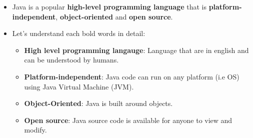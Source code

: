 
\begin{flushleft}

	\begin{itemize}
		\item Java is a popular \textbf{high-level programming language} that is \textbf{platform-independent}, \textbf{object-oriented} and \textbf{open source}.
		\item Let’s understand each bold words in detail:
		\begin{itemize}
			\item \textbf{High level programming langauge}: Language that are in english and can be understood by humans.
			
			
			\newpage
			
			\item \textbf{Platform-independent}: Java code can run on any platform (i.e OS) using Java Virtual Machine (JVM). 
			
						
			\item \textbf{Object-Oriented}: Java is built around objects.
			
			
			\item \textbf{Open source}: Java source code is available for anyone to view and modify.
			
			
		\end{itemize}
	\end{itemize}
		
\end{flushleft}

\newpage

